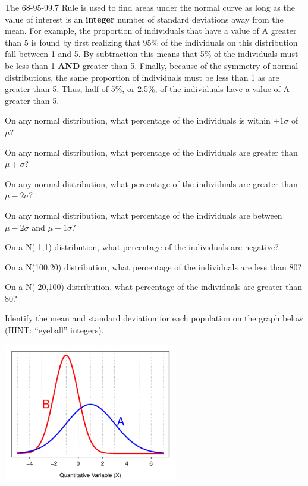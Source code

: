 \documentclass[10pt,openany]{book}\usepackage[]{graphicx}\usepackage[]{color}
\begin{document}
The 68-95-99.7 Rule is used to find areas under the normal curve as long as the value of interest is an \textbf{integer} number of standard deviations away from the mean.  For example, the proportion of individuals that have a value of A greater than 5 is found by first realizing that 95\% of the individuals on this distribution fall between 1 and 5.  By subtraction this means that 5\% of the individuals must be less than 1 \textbf{AND} greater than 5.  Finally, because of the symmetry of normal distributions, the same proportion of individuals must be less than 1 as are greater than 5.  Thus, half of 5\%, or 2.5\%, of the individuals have a value of A greater than 5.


\begin{exsection}
  \item \label{revex:quNorm68} On any normal distribution, what percentage of the individuals is within $\pm1\sigma$ of $\mu$? 
  \item \label{revex:quNorm68gt} On any normal distribution, what percentage of the individuals are greater than $\mu+\sigma$? 
  \item \label{revex:quNorm95gt} On any normal distribution, what percentage of the individuals are greater than $\mu-2\sigma$? 
  \item \label{revex:quNormbt6895} On any normal distribution, what percentage of the individuals are between $\mu-2\sigma$ and $\mu+1\sigma$? 
  \item \label{revex:quNorm84} On a N(-1,1) distribution, what percentage of the individuals are negative? 
  \item \label{revex:quNorm16} On a N(100,20) distribution, what percentage of the individuals are less than 80? 
  \item \label{revex:quNorm16a} On a N(-20,100) distribution, what percentage of the individuals are greater than 80? 
  \item \label{revex:quNormAB} Identify the mean and standard deviation for each population on the graph below (HINT: ``eyeball'' integers). 

    \begin{center}
      \includegraphics[width=3in]{Figs/Guess-1}
    \end{center}
\end{exsection}
\end{document}
